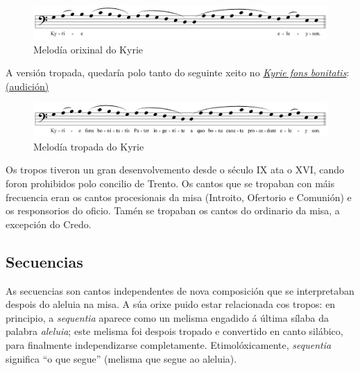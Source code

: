 \documentclass[a4paper, twoside]{templates/ociamthesis}
\begin{document}
\begin{figure}[ht]

{\centering \includegraphics[width=1\linewidth]{figures/ud-03/Kyrie-1} 

}

\caption[Melodía do *Kyrie*]{Melodía orixinal do Kyrie}\label{fig:kyrie-1}
\end{figure}

A versión tropada, quedaría polo tanto do seguinte xeito no \href{https://es.wikipedia.org/wiki/Kyrie_eleison}{\emph{Kyrie fons bonitatis}}: \href{https://open.spotify.com/track/74ztOxzqhvEStzW4pqZII0?si=fbe1ed03f9bf4d6c}{(audición)}

\begin{figure}[ht]

{\centering \includegraphics[width=1\linewidth]{figures/ud-03/Kyrie-fons-bonitatis} 

}

\caption[Melodía tropada do Kyrie fons bonitatis]{Melodía tropada do Kyrie}\label{fig:kyrie-fons-bonitatis}
\end{figure}

Os tropos tiveron un gran desenvolvemento desde o século IX ata o XVI, cando foron prohibidos polo concilio de Trento. Os cantos que se tropaban con máis frecuencia eran os cantos procesionais da misa (Introito, Ofertorio e Comunión) e os responsorios do oficio. Tamén se tropaban os cantos do ordinario da misa, a excepción do Credo.

\hypertarget{secuencias}{%
\subsection{Secuencias}\label{secuencias}}

As secuencias son cantos independentes de nova composición que se interpretaban despois do aleluia na misa. A súa orixe puido estar relacionada cos tropos: en principio, a \emph{sequentia} aparece como un melisma engadido á última sílaba da palabra \emph{aleluia}; este melisma foi despois tropado e convertido en canto silábico, para finalmente independizarse completamente. Etimolóxicamente, \emph{sequentia} significa ``o que segue'' (melisma que segue ao aleluia).
\end{document}
